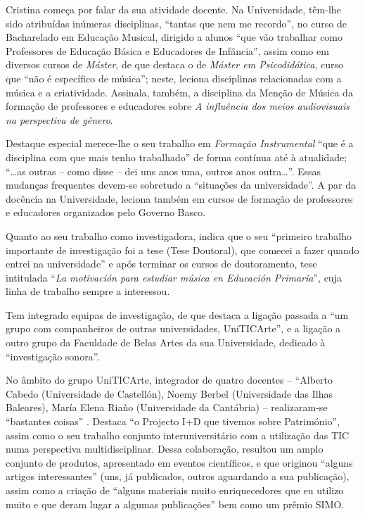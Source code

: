 \documentclass{textolivre}
\begin{document}
Cristina começa por falar da sua atividade docente. Na Universidade, têm-lhe
sido atribuídas inúmeras disciplinas, “tantas que nem me recordo”, no
curso de Bacharelado em Educação Musical, dirigido a alunos “que vão trabalhar
como Professores de Educação Básica e Educadores de Infância”, assim como em
diversos cursos de \textit{Máster}, de que destaca o de \textit{Máster em
Psicodidática}, curso que “não é específico de música”; neste, leciona
disciplinas relacionadas com a música e a criatividade. Assinala, também, a
disciplina da Menção de Música da formação de professores e educadores sobre
\textit{A influência dos meios audiovisuais na perspectiva de género}.

Destaque especial merece-lhe o seu trabalho em \textit{Formação Instrumental}
“que é a disciplina com que mais tenho trabalhado” de forma contínua até à
atualidade; “\ldots as outras – como disse – dei uns anos uma, outros anos
outra\ldots”. Essas mudanças frequentes devem-se sobretudo a “situações da
universidade”. A par da docência na Universidade, leciona também em cursos de
formação de professores e educadores organizados pelo Governo Basco.

Quanto ao seu trabalho como investigadora, indica que o seu “primeiro trabalho
importante de investigação foi a tese (Tese Doutoral), que comecei a fazer
quando entrei na universidade” e após terminar os cursos de doutoramento, tese
intitulada “\textit{La motivación para estudiar música en Educación Primaria}”,
cuja linha de trabalho sempre a interessou.

Tem integrado equipas de investigação, de que destaca a ligação passada a “um
grupo com companheiros de outras universidades, UniTICArte”, e a ligação a
outro grupo da Faculdade de Belas Artes da sua Universidade, dedicado à
“investigação sonora”.

No âmbito do grupo UniTICArte, integrador de quatro docentes – “Alberto Cabedo
(Universidade de Castellón), Noemy Berbel (Universidade das Ilhas Baleares),
María Elena Riaño (Universidade da Cantábria) – realizaram-se “bastantes
coisas” \cite{cabedo2017}. Destaca “o Projecto
I+D que tivemos sobre Património”, assim como o seu trabalho conjunto
interuniversitário com a utilização das TIC numa perspectiva multidisciplinar.
Dessa colaboração, resultou um amplo conjunto de produtos, apresentado em
eventos científicos, e que originou “alguns artigos interessantes” (uns, já
publicados, outros aguardando a sua publicação), assim como a criação de
“alguns materiais muito enriquecedores que eu utilizo muito e que deram lugar a
algumas publicações” bem como um prêmio SIMO.
\end{document}
